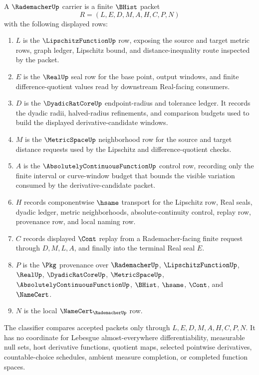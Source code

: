\begin{definition}
\label{def:rademacher-carrier}
A $\RademacherUp$ carrier is a finite $\BHist$ packet
$$
R=(L,E,D,M,A,H,C,P,N)
$$
with the following displayed rows:
\begin{enumerate}
\item $L$ is the $\LipschitzFunctionUp$ row, exposing the source and target metric rows, graph ledger, Lipschitz bound, and distance-inequality route inspected by the packet.
\item $E$ is the $\RealUp$ seal row for the base point, output windows, and finite difference-quotient values read by downstream Real-facing consumers.
\item $D$ is the $\DyadicRatCoreUp$ endpoint-radius and tolerance ledger. It records the dyadic radii, halved-radius refinements, and comparison budgets used to build the displayed derivative-candidate windows.
\item $M$ is the $\MetricSpaceUp$ neighborhood row for the source and target distance requests used by the Lipschitz and difference-quotient checks.
\item $A$ is the $\AbsolutelyContinuousFunctionUp$ control row, recording only the finite interval or curve-window budget that bounds the visible variation consumed by the derivative-candidate packet.
\item $H$ records componentwise $\hsame$ transport for the Lipschitz row, Real seals, dyadic ledger, metric neighborhoods, absolute-continuity control, replay row, provenance row, and local naming row.
\item $C$ records displayed $\Cont$ replay from a Rademacher-facing finite request through $D,M,L,A$, and finally into the terminal Real seal $E$.
\item $P$ is the $\Pkg$ provenance over $\RademacherUp$, $\LipschitzFunctionUp$, $\RealUp$, $\DyadicRatCoreUp$, $\MetricSpaceUp$, $\AbsolutelyContinuousFunctionUp$, $\BHist$, $\hsame$, $\Cont$, and $\NameCert$.
\item $N$ is the local $\NameCert_{\RademacherUp}$ row.
\end{enumerate}
The classifier compares accepted packets only through $L,E,D,M,A,H,C,P,N$. It has no coordinate for Lebesgue almost-everywhere differentiability, measurable null sets, host derivative functions, quotient maps, selected pointwise derivatives, countable-choice schedules, ambient measure completion, or completed function spaces.
\end{definition}

